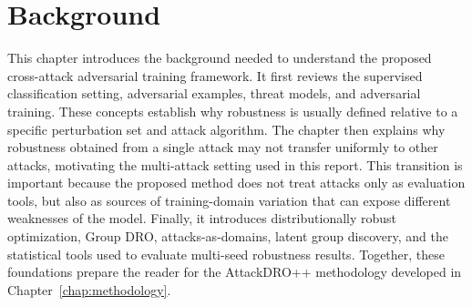 \chapter{Background}
\label{chap:background}
This chapter introduces the background needed to understand the proposed cross-attack
adversarial training framework. It first reviews the supervised classification setting,
adversarial examples, threat models, and adversarial training. These concepts establish
why robustness is usually defined relative to a specific perturbation set and attack
algorithm. The chapter then explains why robustness obtained from a single attack may
not transfer uniformly to other attacks, motivating the multi-attack setting used in this
report. This transition is important because the proposed method does not treat attacks
only as evaluation tools, but also as sources of training-domain variation that can expose
different weaknesses of the model. Finally, it introduces distributionally robust
optimization, Group DRO, attacks-as-domains, latent group discovery, and the statistical
tools used to evaluate multi-seed robustness results. Together, these foundations prepare
the reader for the AttackDRO++ methodology developed in Chapter~\ref{chap:methodology}.






